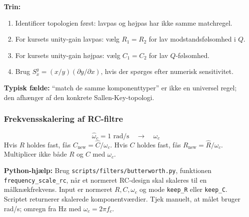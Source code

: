 \textbf{Trin:}
\begin{enumerate}
    \item Identificer topologien først: lavpas og højpas har ikke samme matchregel.
    \item For kursets unity-gain lavpas: vælg \(R_1=R_2\) for lav modstandsfølsomhed i \(Q\).
    \item For kursets unity-gain højpas: vælg \(C_1=C_2\) for lav \(Q\)-følsomhed.
    \item Brug \(S_x^y=(x/y)(\partial y/\partial x)\), hvis der spørges efter numerisk sensitivitet.
\end{enumerate}

\textbf{Typisk fælde:} ``match de samme komponenttyper'' er ikke en universel regel; den afhænger af den konkrete Sallen-Key-topologi.

\subsubsection{Frekvensskalering af RC-filtre}
\[
\hat\omega_c=1\text{ rad/s}\quad\to\quad \omega_c
\]
Hvis \(R\) holdes fast, fås \(C_{\mathrm{new}}=\hat C/\omega_c\). Hvis \(C\) holdes fast, fås \(R_{\mathrm{new}}=\hat R/\omega_c\). Multiplicer ikke både \(R\) og \(C\) med \(\omega_c\).

\textbf{Python-hjælp:} Brug \texttt{scripts/filters/butterworth.py}, funktionen \texttt{frequency\_scale\_rc}, når et normeret RC-design skal skaleres til en målknækfrekvens. Input er normeret \(R,C,\omega_c\) og mode \texttt{keep\_R} eller \texttt{keep\_C}. Scriptet returnerer skalerede komponentværdier. Tjek manuelt, at målet bruger rad/s; omregn fra Hz med \(\omega_c=2\pi f_c\).
